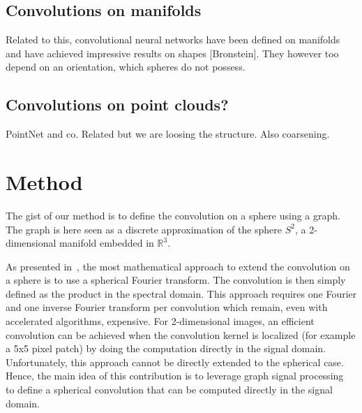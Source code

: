 \documentclass[preprint,12pt,authoryear]{elsarticle}
\newcommand{\1}{\b{1}}              %
\newcommand{\0}{\b{0}}              %
\begin{document}
\subsection{Convolutions on manifolds}

Related to this, convolutional neural networks have been defined on manifolds and have achieved impressive results on shapes [Bronstein]. They however too depend on an orientation, which spheres do not possess.

\subsection{Convolutions on point clouds?}

PointNet and co. Related but we are loosing the structure. Also coarsening.

\section{Method}

The gist of our method is to define the convolution on a sphere using a graph.
The graph is here seen as a discrete approximation of the sphere $S^2$, a
2-dimensional manifold embedded in $\mathbb{R}^3$.

As presented in~\cite{cohen2018spherical}, the most mathematical approach to
extend the convolution on a sphere is to use a spherical Fourier transform. The
convolution is then simply defined as the product in the spectral domain. This
approach requires one Fourier and one inverse Fourier transform per convolution
which remain, even with accelerated algorithms, expensive. For 2-dimensional
images, an efficient convolution can be achieved when the convolution kernel is
localized (for example a 5x5 pixel patch) by doing the computation directly in
the signal domain. Unfortunately, this approach cannot be directly extended to
the spherical case. Hence, the main idea of this contribution is to leverage
graph signal processing~\cite{shuman2013emerging} to define a spherical
convolution that can be computed directly in the signal domain.
\end{document}

